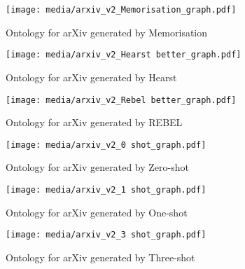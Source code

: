 
\begin{figure}[h]
    \centering
    \texttt{[image: media/arxiv\_v2\_Memorisation\_graph.pdf]}
    \caption{Ontology for arXiv generated by Memorisation}
\end{figure}


\begin{figure}[h]
    \centering
    \texttt{[image: media/arxiv\_v2\_Hearst better\_graph.pdf]}
    \caption{Ontology for arXiv generated by Hearst}
    \label{fig:hearst-arxiv}
\end{figure}


\begin{figure}[h]
    \centering
    \texttt{[image: media/arxiv\_v2\_Rebel better\_graph.pdf]}
    \caption{Ontology for arXiv generated by REBEL}
    \label{fig:rebel-arxiv}
\end{figure}


\begin{figure}[h]
    \centering
    \texttt{[image: media/arxiv\_v2\_0 shot\_graph.pdf]}
    \caption{Ontology for arXiv generated by Zero-shot}
\end{figure}

\begin{figure}[h]
    \centering
    \texttt{[image: media/arxiv\_v2\_1 shot\_graph.pdf]}
    \caption{Ontology for arXiv generated by One-shot}
\end{figure}

\begin{figure}[h]
    \centering
    \texttt{[image: media/arxiv\_v2\_3 shot\_graph.pdf]}
    \caption{Ontology for arXiv generated by Three-shot}
    \label{fig:3shot-arxiv}
\end{figure}